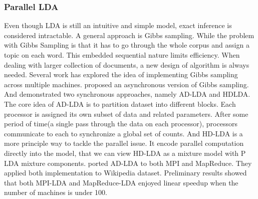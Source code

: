 \subsubsection{Parallel LDA}
Even though LDA is still an intuitive and simple model, exact inference is considered intractable. A general approach is Gibbs sampling. While the problem with Gibbs Sampling is that it has to go through the whole corpus and assign a topic on each word. This embedded sequential nature limits efficiency. When dealing with larger collection of documents, a new design of algorithm is always needed. Several work has explored the idea of implementing Gibbs sampling across multiple machines. \cite{smyth2008asynchronous} proposed an asynchronous version of Gibbs sampling. And \cite{newman2007distributed} demonstrated two synchronous approaches, namely AD-LDA and HDLDA. The core idea of AD-LDA is to partition dataset into different blocks. Each processor is assigned its own subset of data and related parameters. After some period of time(a single pass through the data on each processor), processors communicate to each to synchronize a global set of counts. And HD-LDA is a more principle way to tackle the parallel issue. It encode parallel computation directly into the model, that we can view HD-LDA as a mixture model with P LDA mixture components. \cite{wang2009plda} ported AD-LDA to both MPI and MapReduce. They applied both implementation to Wikipedia dataset. Preliminary results showed that both MPI-LDA and MapReduce-LDA enjoyed linear speedup when the number of machines is under 100. 
